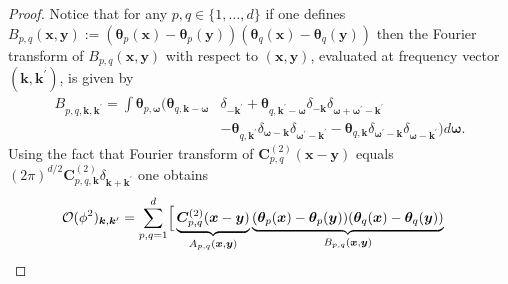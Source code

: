 \documentclass[10pt,noinfoline]{imsart}
\newcommand{\bs}{\boldsymbol}
\begin{document}
\begin{proof}
    Notice that for any $p,q \in \{1,\ldots, d\}$ if one defines $B_{p,q}(\bs x,\bs y) := (\bs\theta_p(\bs x)-\bs\theta_p(\bs y))(\bs\theta_q(\bs x)-\bs\theta_q(\bs y))$ then the Fourier transform of $B_{p,q}(\bs x,\bs y)$ with respect to $(\bs x,\bs y)$, evaluated at frequency vector $(\bs k,\bs k^\prime)$, is given by
    \begin{align*}
       B_{p,q,\bs k,\bs k^\prime} = \int \bs\theta_{p,\bs\omega}\Big(
        \bs\theta_{q,\bs k - \bs \omega}&\delta_{-\bs k^\prime}
        + \bs\theta_{q,\bs k^\prime - \bs \omega}\delta_{-\bs k}\delta_{\bs\omega+\bs\omega^\prime-\bs k^\prime} \\
        &- \bs\theta_{q,\bs k^\prime}\delta_{\bs\omega-\bs k}\delta_{\bs\omega^\prime-\bs k^\prime}
        - \bs\theta_{q,\bs k}\delta_{\bs\omega^\prime-\bs k}\delta_{\bs\omega-\bs k^\prime}
        \Big)d\bs\omega. 
    \end{align*}
    Using the fact that  Fourier transform of $\bs C^{(2)}_{p,q}(\bs x-\bs y)$ equals ${(2\pi)}^{d/2}\bs C^{(2)}_{p,q,\bs k} \delta_{\bs k+\bs k^\prime}$ one obtains
    \begin{align}
        \mathcal O(\phi^2)_{\bs k, \bs k^\prime} &= \sum_{p,q=1}^d\Bigl[
        \,
        \underbrace{\bs C^{(2)}_{p,q}(\bs x-\bs y)}_{A_{p,q}(\bs x,\bs y)}
        \underbrace{(\bs\theta_p(\bs x)-\bs\theta_p(\bs y))(\bs\theta_q(\bs x)-\bs\theta_q(\bs y))}_{B_{p,q}(\bs x,\bs y)}

\end{align}
\end{proof}
\end{document}
